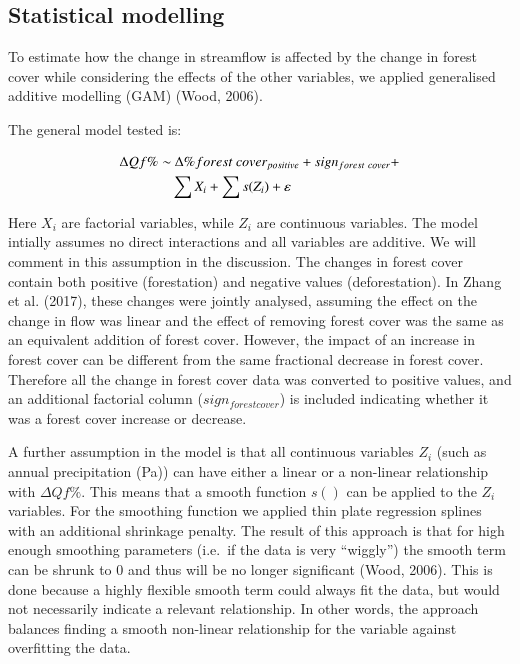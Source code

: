\documentclass[]{elsarticle} %
\begin{document}
\hypertarget{statistical-modelling}{%
\subsection{Statistical modelling}\label{statistical-modelling}}

To estimate how the change in streamflow is affected by the change in forest cover while considering the effects of the other variables, we applied generalised additive modelling (GAM) (Wood, 2006).

The general model tested is:

\begin{align}
\Delta Qf \% \sim &~ \Delta \% forest~cover_{positive} + sign_{forest~cover} + \notag \\ 
& \sum{X_i} + \sum{s(Z_i)} + \varepsilon \label{eq:eq2}
\end{align}

Here \(X_i\) are factorial variables, while \(Z_i\) are continuous variables. The model intially assumes no direct interactions and all variables are additive. We will comment in this assumption in the discussion. The changes in forest cover contain both positive (forestation) and negative values (deforestation). In Zhang et al. (2017), these changes were jointly analysed, assuming the effect on the change in flow was linear and the effect of removing forest cover was the same as an equivalent addition of forest cover. However, the impact of an increase in forest cover can be different from the same fractional decrease in forest cover. Therefore all the change in forest cover data was converted to positive values, and an additional factorial column (\(sign_{forest cover}\)) is included indicating whether it was a forest cover increase or decrease.

A further assumption in the model is that all continuous variables \(Z_i\) (such as annual precipitation (Pa)) can have either a linear or a non-linear relationship with \(\Delta Qf \%\). This means that a smooth function \(s()\) can be applied to the \(Z_i\) variables. For the smoothing function we applied thin plate regression splines with an additional shrinkage penalty. The result of this approach is that for high enough smoothing parameters (i.e.~if the data is very ``wiggly'') the smooth term can be shrunk to 0 and thus will be no longer significant (Wood, 2006). This is done because a highly flexible smooth term could always fit the data, but would not necessarily indicate a relevant relationship. In other words, the approach balances finding a smooth non-linear relationship for the variable against overfitting the data.
\end{document}
